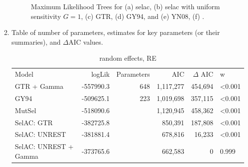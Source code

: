\documentclass{article}
\newcommand{\DeltaAIC}{\ensuremath{\Delta\text{AIC}}\xspace}
\begin{document}
\begin{enumerate}
\begin{figure}[H]
  \qquad
  \qquad
  \caption{Maximum Likelihood Trees for (a) selac, (b) selac with uniform sensitivity $G = 1$, (c) GTR, (d) GY94, and (e) YN08, (f) \citet{LartillotAndPhilippe2004}.}
  \label{fig:MleTrees}
\end{figure}
\item Table of number of parameters, estimates for key parameters (or their summaries), and \DeltaAIC values.
\begin{table}
\begin{tabular}{lrrrrl}
  Model                 & logLik   & Parameters&     AIC& $\Delta$ AIC& w\\
  GTR + Gamma           & -557990.3&        648& 1,117,277& 454,694& <0.001\\
  GY94                  & -509625.1&        223& 1,019,698& 357,115& <0.001\\
  MutSel                & -518090.6&           & 1,120,945& 458,362& <0.001\\
  SelAC: GTR            & -382725.8&           &   850,391& 187,808& <0.001\\
  SelAC: UNREST         & -381881.4&           &   678,816&  16,233& <0.001\\
  SelAC: UNREST + Gamma & -373765.6&           &   662,583&       0& 0.999
\end{tabular}
\caption{random effects, RE}
\end{table}


\end{enumerate}
\end{document}
